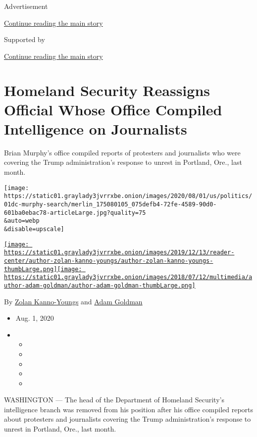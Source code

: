 Advertisement

\protect\hyperlink{after-top}{Continue reading the main story}

Supported by

\protect\hyperlink{after-sponsor}{Continue reading the main story}

\hypertarget{homeland-security-reassigns-official-whose-office-compiled-intelligence-on-journalists}{%
\section{Homeland Security Reassigns Official Whose Office Compiled
Intelligence on
Journalists}\label{homeland-security-reassigns-official-whose-office-compiled-intelligence-on-journalists}}

Brian Murphy's office compiled reports of protesters and journalists who
were covering the Trump administration's response to unrest in Portland,
Ore., last month.

\texttt{[image: https://static01.graylady3jvrrxbe.onion/images/2020/08/01/us/politics/01dc-murphy-search/merlin\_175080105\_075defb4-72fe-4589-90d0-601ba0ebac78-articleLarge.jpg?quality=75\\\&auto=webp\\\&disable=upscale]}

\href{https://www.nytimes3xbfgragh.onion/by/zolan-kanno-youngs}{\texttt{[image: https://static01.graylady3jvrrxbe.onion/images/2019/12/13/reader-center/author-zolan-kanno-youngs/author-zolan-kanno-youngs-thumbLarge.png]}}\href{https://www.nytimes3xbfgragh.onion/by/adam-goldman}{\texttt{[image: https://static01.graylady3jvrrxbe.onion/images/2018/07/12/multimedia/author-adam-goldman/author-adam-goldman-thumbLarge.png]}}

By \href{https://www.nytimes3xbfgragh.onion/by/zolan-kanno-youngs}{Zolan
Kanno-Youngs} and
\href{https://www.nytimes3xbfgragh.onion/by/adam-goldman}{Adam Goldman}

\begin{itemize}
\item
  Aug. 1, 2020
\item
  \begin{itemize}
  \item
  \item
  \item
  \item
  \item
  \end{itemize}
\end{itemize}

WASHINGTON --- The head of the Department of Homeland Security's
intelligence branch was removed from his position after his office
compiled reports about protesters and journalists covering the Trump
administration's response to unrest in Portland, Ore., last month.


